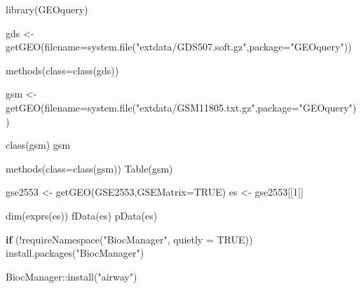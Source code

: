 \documentclass[
]{book}
\newenvironment{Shaded}{\begin{snugshade}}{\end{snugshade}}
\newcommand{\AttributeTok}[1]{\textcolor[rgb]{0.77,0.63,0.00}{#1}}
\newcommand{\ConstantTok}[1]{\textcolor[rgb]{0.00,0.00,0.00}{#1}}
\newcommand{\ControlFlowTok}[1]{\textcolor[rgb]{0.13,0.29,0.53}{\textbf{#1}}}
\newcommand{\DecValTok}[1]{\textcolor[rgb]{0.00,0.00,0.81}{#1}}
\newcommand{\FunctionTok}[1]{\textcolor[rgb]{0.00,0.00,0.00}{#1}}
\newcommand{\NormalTok}[1]{#1}
\newcommand{\OtherTok}[1]{\textcolor[rgb]{0.56,0.35,0.01}{#1}}
\newcommand{\SpecialCharTok}[1]{\textcolor[rgb]{0.00,0.00,0.00}{#1}}
\newcommand{\StringTok}[1]{\textcolor[rgb]{0.31,0.60,0.02}{#1}}
\begin{document}
\begin{Shaded}
\begin{Highlighting}[]
\FunctionTok{library}\NormalTok{(GEOquery)}

\NormalTok{gds }\OtherTok{\textless{}{-}} \FunctionTok{getGEO}\NormalTok{(}\AttributeTok{filename=}\FunctionTok{system.file}\NormalTok{(}\StringTok{"extdata/GDS507.soft.gz"}\NormalTok{,}\AttributeTok{package=}\StringTok{"GEOquery"}\NormalTok{))}


\FunctionTok{methods}\NormalTok{(}\AttributeTok{class=}\FunctionTok{class}\NormalTok{(gds))}

\NormalTok{gsm }\OtherTok{\textless{}{-}} \FunctionTok{getGEO}\NormalTok{(}\AttributeTok{filename=}\FunctionTok{system.file}\NormalTok{(}\StringTok{"extdata/GSM11805.txt.gz"}\NormalTok{,}\AttributeTok{package=}\StringTok{"GEOquery"}\NormalTok{))}

\FunctionTok{class}\NormalTok{(gsm)}
\NormalTok{gsm}

\FunctionTok{methods}\NormalTok{(}\AttributeTok{class=}\FunctionTok{class}\NormalTok{(gsm))}
\FunctionTok{Table}\NormalTok{(gsm)}
\end{Highlighting}
\end{Shaded}

\begin{Shaded}
\begin{Highlighting}[]


\NormalTok{gse2553 }\OtherTok{\textless{}{-}} \FunctionTok{getGEO}\NormalTok{(}\StringTok{\textquotesingle{}GSE2553\textquotesingle{}}\NormalTok{,}\AttributeTok{GSEMatrix=}\ConstantTok{TRUE}\NormalTok{)}
\NormalTok{es }\OtherTok{\textless{}{-}}\NormalTok{ gse2553[[}\DecValTok{1}\NormalTok{]]}

\FunctionTok{dim}\NormalTok{(}\FunctionTok{exprs}\NormalTok{(es))}
\FunctionTok{fData}\NormalTok{(es)}
\FunctionTok{pData}\NormalTok{(es)}
\end{Highlighting}
\end{Shaded}

\begin{Shaded}
\begin{Highlighting}[]
\ControlFlowTok{if}\NormalTok{ (}\SpecialCharTok{!}\FunctionTok{requireNamespace}\NormalTok{(}\StringTok{"BiocManager"}\NormalTok{, }\AttributeTok{quietly =} \ConstantTok{TRUE}\NormalTok{))}
    \FunctionTok{install.packages}\NormalTok{(}\StringTok{"BiocManager"}\NormalTok{)}

\NormalTok{BiocManager}\SpecialCharTok{::}\FunctionTok{install}\NormalTok{(}\StringTok{"airway"}\NormalTok{)}
\end{Highlighting}
\end{Shaded}
\end{document}
